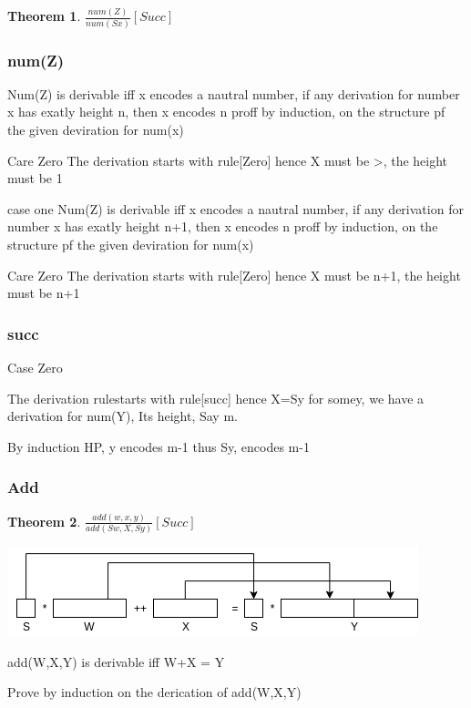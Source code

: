 \documentclass[a4paper,10pt,titlepage]{report}
\newtheorem{theorem}{Theorem}
\begin{document}
\begin{theorem}

$\frac{num(Z)}{num(Sx)}[Succ]$

\end{theorem}
\subsubsection{num(Z)}
Num(Z) is derivable iff x encodes a nautral number, if any derivation for number x has exatly height n, then x encodes n
proff by induction, on the structure pf the given deviration for num(x)

Care Zero
The derivation starts with rule[Zero] hence X must be >, the height must be 1

case one
Num(Z) is derivable iff x encodes a nautral number, if any derivation for number x has exatly height n+1, then x encodes n
proff by induction, on the structure pf the given deviration for num(x)

Care Zero
The derivation starts with rule[Zero] hence X must be n+1, the height must be n+1

\subsubsection{succ}
Case Zero

The derivation rulestarts with rule[succ] hence X=Sy for somey, we have a derivation for num(Y), Its height, Say m.

By induction HP, y encodes m-1 thus Sy, encodes m-1


\subsubsection{Add}
\begin{theorem}

$\frac{add(w,x,y)}{add(Sw, X, Sy)}[Succ]$

\end{theorem}

\includegraphics[scale=0.4]{draw.io/fig1.png}

add(W,X,Y) is derivable iff W+X = Y

Prove by induction on the derication of add(W,X,Y)
\end{document}
